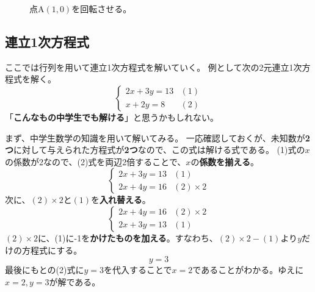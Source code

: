 \documentclass[10pt]{jsarticle}
\theoremstyle{definition}%
\numberwithin{equation}{section}%
\begin{document}
\begin{figure}[H]
  \centering
      \centering
\caption{点A$(1,0)$を回転させる。}
\label{kaiten}
\end{figure}
\subsection{連立1次方程式}
ここでは行列を用いて連立1次方程式を解いていく。
例として次の2元連立1次方程式を解く。
\begin{equation}
\label{renho}  \begin{cases}
    2x+3y =13 &  (1)\\
    x+2y=8 &  (2)
  \end{cases} 
\end{equation}
「{\bf こんなもの中学生でも解ける}」と思うかもしれない。

まず、中学生数学の知識を用いて解いてみる。
一応確認しておくが、未知数が{\bf 2つ}に対して与えられた方程式が{\bf 2つ}なので、この式は解ける式である。
(1)式の$x$の係数が2なので、(2)式を両辺2倍することで、$x$の{\bf 係数を揃える}。
\begin{equation}
  \begin{cases}
    2x+3y =13 &  (1)\\
    2x+4y=16 &  (2)\times2
  \end{cases} 
\end{equation}
次に、$(2)\times2$と$(1)$を{\bf 入れ替える}。
\begin{equation}
  \begin{cases}
    2x+4y=16 &  (2)\times2\\
    2x+3y =13 &  (1)
  \end{cases} 
\end{equation}
$(2)\times2$に、(1)に-1を{\bf かけたものを加える}。すなわち、$(2)\times2-(1)$より$y$だけの方程式にする。
\begin{equation}
  y=3
\end{equation}
最後にもとの(2)式に$y=3$を代入することで$x=2$であることがわかる。ゆえに\underline{$x=2,y=3$}が解である。
\end{document}
